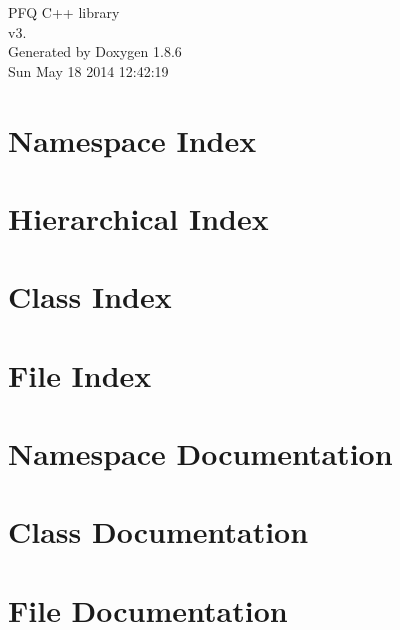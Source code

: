 \documentclass[twoside]{book}
\newcommand{\clearemptydoublepage}{%
  \newpage{\pagestyle{empty}\cleardoublepage}%
}
\begin{document}
\hypersetup{pageanchor=false}
\begin{titlepage}
\vspace*{7cm}
\begin{center}%
{\Large P\-F\-Q C++ library \\[1ex]\large v3. }\\
\vspace*{1cm}
{\large Generated by Doxygen 1.8.6}\\
\vspace*{0.5cm}
{\small Sun May 18 2014 12:42:19}\\
\end{center}
\end{titlepage}
\clearemptydoublepage
\tableofcontents
\clearemptydoublepage
{}
\hypersetup{pageanchor=true}

\chapter{Namespace Index}

\chapter{Hierarchical Index}

\chapter{Class Index}

\chapter{File Index}

\chapter{Namespace Documentation}



\chapter{Class Documentation}

















\chapter{File Documentation}





\newpage
{}
{}
\printindex
\end{document}
